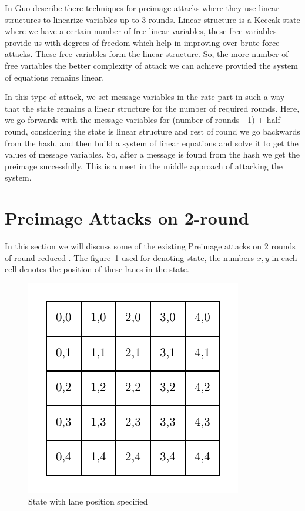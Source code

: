 In \cite{guo2016linear} Guo \etal describe there techniques for preimage attacks where they use linear structures to linearize variables up to 3 rounds. Linear structure is a Keccak state where we have a certain number of free linear variables, these free variables provide us with degrees of freedom which help in improving over brute-force attacks. These free variables form the linear structure. So, the more number of free variables the better complexity of attack we can achieve provided the system of equations remains linear.

In this type of attack, we set message variables in the rate part in such a way that the state remains a linear structure for the number of required rounds. Here, we go forwards with the message variables for (number of rounds - 1) + half round, considering the state is linear structure and rest of round we go backwards from the hash, and then build a system of linear equations and solve it to get the values of message variables. So, after a message is found from the hash we get the preimage successfully. This is a meet in the middle approach of attacking the system.

\section{Preimage Attacks on 2-round \KECCAK}

In this section we will discuss some of the existing Preimage attacks on 2 rounds of round-reduced \KECCAK{}. The figure~\ref{fig:linkeccakstate} used for denoting \KECCAK{} state, the numbers $x,y$ in each cell denotes the position of these lanes in the state.

\begin{figure}
    \centering
    \includegraphics{keccakState.pdf}
    \caption{\KECCAK{} State with lane position specified}
    \label{fig:linkeccakstate}
\end{figure}


